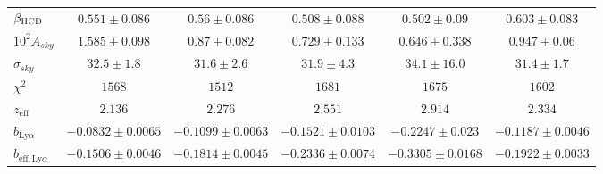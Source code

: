 \begin{table}[]
\begin{tabular}{lccccc}
$\beta_{\textsc{HCD}} $ & $ 0.551 \pm 0.086$ & $ 0.56 \pm 0.086$ & $ 0.508 \pm 0.088$ & $ 0.502 \pm 0.09$ & $ 0.603 \pm 0.083$ \\
$10^2 A_{sky} $ & $ 1.585 \pm 0.098$ & $ 0.87 \pm 0.082$ & $ 0.729 \pm 0.133$ & $ 0.646 \pm 0.338$ & $ 0.947 \pm 0.06$ \\
$\sigma_{sky} $ & $ 32.5 \pm 1.8$ & $ 31.6 \pm 2.6$ & $ 31.9 \pm 4.3$ & $ 34.1 \pm 16.0$ & $ 31.4 \pm 1.7$ \\
\midrule
$\chi^2$ & $ 1568 $ & $ 1512 $ & $ 1681 $ & $ 1675 $ & $ 1602 $ \\
$z_{\mathrm{eff}}$ & $ 2.136 $ & $ 2.276 $ & $ 2.551 $ & $ 2.914 $ & $ 2.334 $ \\
\midrule
$b_{\mathrm{Ly}\alpha} $ & $ -0.0832 \pm 0.0065$ & $ -0.1099 \pm 0.0063$ & $ -0.1521 \pm 0.0103$ & $ -0.2247 \pm 0.023$ & $ -0.1187 \pm 0.0046$ \\
$b_{\mathrm{eff}, \mathrm{Ly}\alpha} $ & $ -0.1506 \pm 0.0046$ & $ -0.1814 \pm 0.0045$ & $ -0.2336 \pm 0.0074$ & $ -0.3305 \pm 0.0168$ & $ -0.1922 \pm 0.0033$ \\
\bottomrule
\end{tabular}
\end{table}


